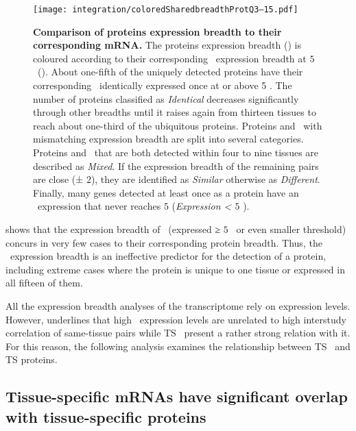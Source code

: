 \begin{figure}[!htpb]
    \texttt{[image: integration/coloredSharedbreadthProtQ3--15.pdf]}\centering
    \vspace{-4mm}
    \caption[Comparison of proteins expression breadth to
    corresponding mRNA breadth]{\label{fig:SharedBreadthProtQ3}%
    \textbf{Comparison of proteins expression breadth to their corresponding mRNA.}
    The proteins expression breadth ()
    is coloured according to
    their corresponding \mRNA\ expression breadth at $5$ \FPKM\
    ().
    About one-fifth of the uniquely detected proteins have
    their corresponding \mRNA\ identically expressed once at or above 5 \FPKM{}.
    The number of proteins classified as \emph{Identical} decreases significantly
    through other breadths until it raises again from thirteen tissues
    to reach about one-third of the ubiquitous proteins.
    Proteins and \mRNAs\ with mismatching expression breadth are split into
    several categories.
    Proteins and \mRNAs\ that are both detected within four to nine tissues
    are described as \emph{Mixed}.
    If the expression breadth of the remaining pairs are close (± $2$),
    they are identified as \emph{Similar} otherwise as \emph{Different}.
    Finally, many genes detected at least once as a protein have
    an \mRNA\ expression that never reaches $5$ \FPKM{} (\emph{Expression < $5$ \FPKM}).
    }
\end{figure}

 shows that the expression breadth
of \mRNAs\ (expressed ≥ $5$ \FPKM\ or even smaller threshold) concurs
in very few cases to their corresponding protein breadth.
Thus, the \mRNAs\ expression breadth is
an ineffective predictor for the detection of a protein,
including extreme cases where the protein is unique to one tissue
or expressed in all fifteen of them.

All the expression breadth analyses of the transcriptome rely on expression levels.
However, \Cref{ch:Transcriptomics} underlines that
high \mRNA\ expression levels are unrelated
to high interstudy correlation of same-tissue pairs
while \gls{TS} \mRNAs\ present a rather strong relation with it.
For this reason, the following analysis examines
the relationship between \gls{TS} \mRNAs\ and \gls{TS} proteins.


\subsection{Tissue-specific \texorpdfstring{\MakeLowercase{m}RNAs}{mRNAs} %
have significant overlap with tissue-specific proteins}\label{sec:TSprotMrna}

